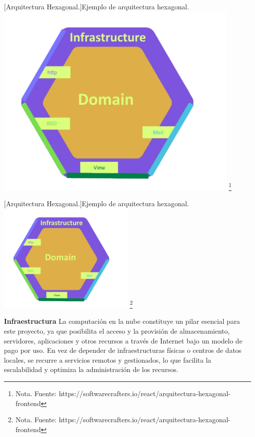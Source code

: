\begin{itemize}
\begin{itemize}
    \vspace{2mm}
    \begin{minipage}{0.9\textwidth}
        \centering
        [{Arquitectura Hexagonal.}]{Ejemplo de arquitectura hexagonal.}
        \label{hexagonal}
        \includegraphics[width=0.9\textwidth]{Content/Images/hexagonal.png}
        \footnote{Nota. \textup{Fuente: https://softwarecrafters.io/react/arquitectura-hexagonal-frontend}}
    \end{minipage}
\vspace{2mm}
\begin{minipage}{0.9\textwidth}
    \centering
    [{Arquitectura Hexagonal.}]{Ejemplo de arquitectura hexagonal.}
    \label{hexagonal}
    \includegraphics[width=0.5\textwidth]{Content/Images/hexagonal.png}
    \footnote{Nota. \textup{Fuente: https://softwarecrafters.io/react/arquitectura-hexagonal-frontend}}
\end{minipage}
    
\end{itemize}
\textbf{Infraestructura}
\newline
La computación en la nube constituye un pilar esencial para este proyecto, ya que posibilita el acceso y la provisión de almacenamiento, servidores, aplicaciones y otros recursos a través de Internet bajo un modelo de pago por uso. En vez de depender de infraestructuras físicas o centros de datos locales, se recurre a servicios remotos y gestionados, lo que facilita la escalabilidad y optimiza la administración de los recursos.


\end{itemize}
